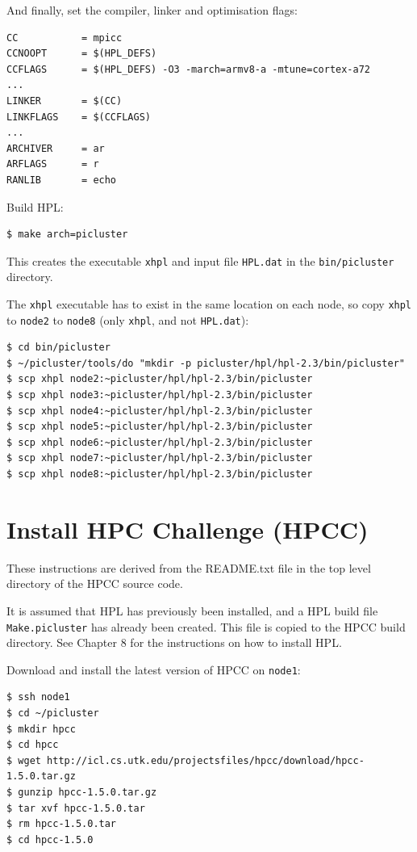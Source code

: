 \documentclass{report}
\begin{document}
And finally, set the compiler, linker and optimisation flags:

\lstset{style=listing}
\begin{lstlisting}[numbers=none]  
CC           = mpicc
CCNOOPT      = $(HPL_DEFS)
CCFLAGS      = $(HPL_DEFS) -O3 -march=armv8-a -mtune=cortex-a72
...
LINKER       = $(CC)
LINKFLAGS    = $(CCFLAGS)
...
ARCHIVER     = ar
ARFLAGS      = r
RANLIB       = echo
\end{lstlisting}

Build HPL:

\lstset{style=type}
\begin{lstlisting}
$ make arch=picluster   
\end{lstlisting}

This creates the executable \verb|xhpl| and input file \verb|HPL.dat| in the \verb|bin/picluster| directory.

The \verb|xhpl| executable has to exist in the same location on each node, so copy \verb|xhpl| to \verb|node2| to \verb|node8| (only \verb|xhpl|, and not \verb|HPL.dat|):

\lstset{style=type}
\begin{lstlisting}
$ cd bin/picluster
$ ~/picluster/tools/do "mkdir -p picluster/hpl/hpl-2.3/bin/picluster"
$ scp xhpl node2:~picluster/hpl/hpl-2.3/bin/picluster
$ scp xhpl node3:~picluster/hpl/hpl-2.3/bin/picluster
$ scp xhpl node4:~picluster/hpl/hpl-2.3/bin/picluster
$ scp xhpl node5:~picluster/hpl/hpl-2.3/bin/picluster
$ scp xhpl node6:~picluster/hpl/hpl-2.3/bin/picluster
$ scp xhpl node7:~picluster/hpl/hpl-2.3/bin/picluster
$ scp xhpl node8:~picluster/hpl/hpl-2.3/bin/picluster
\end{lstlisting}


%
%
\chapter{Install HPC Challenge (HPCC)}

These instructions are derived from the README.txt file in the top level directory of the HPCC source code.

It is assumed that HPL has previously been installed, and a HPL build file \verb|Make.picluster| has already been created. This file is copied to the HPCC build directory. See Chapter 8 for the instructions on how to install HPL.

Download and install the latest version of HPCC on \verb|node1|:

\lstset{style=type}
\begin{lstlisting}
$ ssh node1
$ cd ~/picluster
$ mkdir hpcc
$ cd hpcc
$ wget http://icl.cs.utk.edu/projectsfiles/hpcc/download/hpcc-1.5.0.tar.gz
$ gunzip hpcc-1.5.0.tar.gz
$ tar xvf hpcc-1.5.0.tar
$ rm hpcc-1.5.0.tar
$ cd hpcc-1.5.0
\end{lstlisting}
\end{document}
